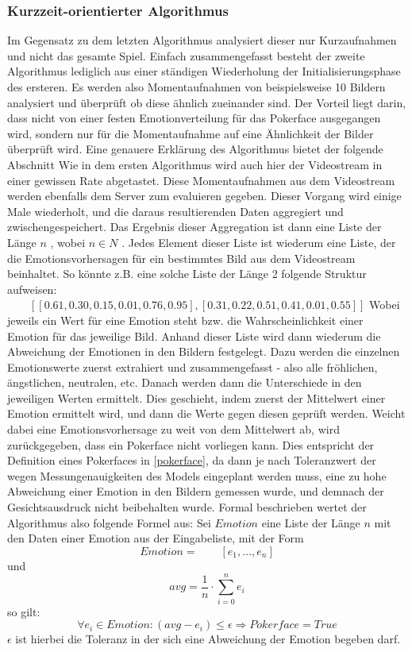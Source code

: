 \documentclass[12pt, a4paper]{scrbook}
\begin{document}
\subsubsection{Kurzzeit-orientierter Algorithmus}
Im Gegensatz zu dem letzten Algorithmus analysiert dieser nur Kurzaufnahmen und nicht das gesamte Spiel. Einfach zusammengefasst besteht der zweite Algorithmus lediglich aus einer ständigen Wiederholung der Initialisierungsphase des ersteren. Es werden also Momentaufnahmen von beispielsweise 10 Bildern analysiert und überprüft ob diese ähnlich zueinander sind. Der Vorteil liegt darin, dass nicht von einer festen Emotionverteilung für das Pokerface ausgegangen wird, sondern nur für die Momentaufnahme auf eine Ähnlichkeit der Bilder überprüft wird. Eine genauere Erklärung des Algorithmus bietet der folgende Abschnitt
\newline
Wie in dem ersten Algorithmus wird auch hier der Videostream in einer gewissen Rate abgetastet. Diese Momentaufnahmen aus dem Videostream werden ebenfalls dem Server zum evaluieren gegeben. Dieser Vorgang wird einige Male wiederholt, und die daraus resultierenden Daten aggregiert und zwischengespeichert. Das Ergebnis dieser Aggregation ist dann eine Liste der Länge 
$ n $  , wobei $ n \in N $
. Jedes Element dieser Liste ist wiederum eine Liste, der die Emotionsvorhersagen für ein bestimmtes Bild aus dem Videostream beinhaltet. So könnte z.B. eine solche Liste der Länge 2 folgende Struktur aufweisen: \newline
$ \qquad[ [0.61, 0.30, 0.15, 0.01, 0.76, 0.95] , [0.31, 0.22, 0.51, 0.41, 0.01, 0.55] ] $
Wobei jeweils ein Wert für eine Emotion steht bzw. die Wahrscheinlichkeit einer Emotion für das jeweilige Bild. Anhand dieser Liste wird dann wiederum die Abweichung der Emotionen in den Bildern festgelegt. Dazu werden die einzelnen Emotionswerte zuerst extrahiert und zusammengefasst - also alle fröhlichen, ängstlichen, neutralen, etc. Danach werden dann die Unterschiede in den jeweiligen Werten ermittelt.
Dies geschieht, indem zuerst der Mittelwert einer Emotion ermittelt wird, und dann die Werte gegen diesen geprüft werden. Weicht dabei eine Emotionsvorhersage zu weit von dem Mittelwert ab, wird zurückgegeben, dass ein Pokerface nicht vorliegen kann. Dies entspricht der Definition eines Pokerfaces in \ref{pokerface}, da dann je nach Toleranzwert der  wegen Messungenauigkeiten des Models eingeplant werden muss, eine zu hohe Abweichung einer Emotion in den Bildern gemessen wurde, und demnach der Gesichtsausdruck nicht beibehalten wurde.
Formal beschrieben wertet der Algorithmus also folgende Formel aus: \newline
Sei $ Emotion $ eine Liste der Länge $ n $ mit den Daten einer Emotion aus der Eingabeliste, mit der Form $$ Emotion = \qquad [e_{1}, \dots ,e_{n}] $$ 
und 
$$avg =\frac{1}{n} \cdot \sum_{i = 0}^{n} e_{i} $$
 so gilt:
\newline $$ \forall e_{i} \in Emotion : (avg - e_{i} ) \leq \epsilon \Rightarrow Pokerface = True $$
 $ \epsilon$ ist hierbei die Toleranz in der sich eine Abweichung der Emotion begeben darf.
\end{document}
